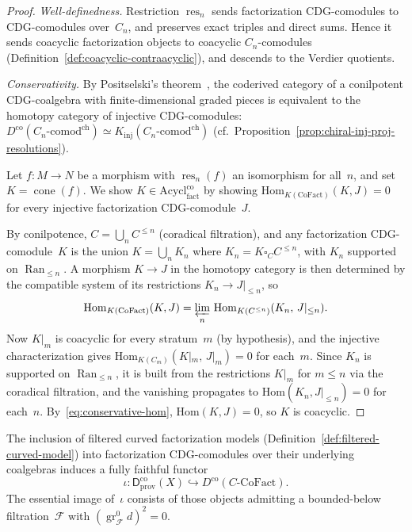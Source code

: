 \begin{proof}
\emph{Well-definedness.}
Restriction $\operatorname{res}_n$ sends factorization
CDG-comodules to CDG-comodules over~$C_n$, and preserves exact
triples and direct sums.  Hence it sends coacyclic factorization
objects to coacyclic $C_n$-comodules
(Definition~\ref{def:coacyclic-contraacyclic}), and descends to
the Verdier quotients.

\emph{Conservativity.}
By Positselski's theorem~\cite[\S5.4]{Positselski11},
the coderived category of a conilpotent CDG-coalgebra with
finite-dimensional graded pieces is equivalent to the homotopy
category of injective CDG-comodules:
$D^{\mathrm{co}}(C_n\text{-}\mathrm{comod}^{\mathrm{ch}})
\simeq K_{\mathrm{inj}}(C_n\text{-}\mathrm{comod}^{\mathrm{ch}})$
(cf.\ Proposition~\ref{prop:chiral-inj-proj-resolutions}).

Let $f \colon M \to N$ be a morphism with
$\operatorname{res}_n(f)$ an isomorphism for all~$n$, and set
$K = \operatorname{cone}(f)$.  We show
$K \in \mathrm{Acycl}^{\mathrm{co}}_{\mathrm{fact}}$ by showing
$\mathrm{Hom}_{K(\mathrm{CoFact})}(K, J) = 0$ for every
injective factorization CDG-comodule~$J$.

By conilpotence, $C = \bigcup_n C^{\leq n}$ (coradical
filtration), and any factorization CDG-comodule~$K$ is the union
$K = \bigcup_n K_n$ where $K_n = K \square_C C^{\leq n}$, with
$K_n$ supported on $\operatorname{Ran}_{\leq n}$.  A morphism
$K \to J$ in the homotopy category is then determined by the
compatible system of its restrictions
$K_n \to J|_{\leq n}$, so
\begin{equation}\label{eq:conservative-hom}
\mathrm{Hom}_{K(\mathrm{CoFact})}(K, J)
= \varprojlim_n\,
\mathrm{Hom}_{K(C^{\leq n})}(K_n,\, J|_{\leq n}).
\end{equation}
Now $K|_m$ is coacyclic for every stratum~$m$ (by hypothesis),
and the injective characterization gives
$\mathrm{Hom}_{K(C_m)}(K|_m,\, J|_m) = 0$ for each~$m$.  Since
$K_n$ is supported on $\operatorname{Ran}_{\leq n}$, it is built
from the restrictions $K|_m$ for $m \leq n$ via the coradical
filtration, and the vanishing propagates to
$\mathrm{Hom}(K_n, J|_{\leq n}) = 0$ for each~$n$.
By~\eqref{eq:conservative-hom},
$\mathrm{Hom}(K, J) = 0$, so $K$ is coacyclic.
\end{proof}

\begin{proposition}
\label{prop:provisional-embedding}
The inclusion of filtered curved factorization models
\textup{(}Definition~\textup{\ref{def:filtered-curved-model})}
into factorization CDG-comodules over their underlying coalgebras
induces a fully faithful functor
\[
\iota \colon
\mathsf{D}^{\mathrm{co}}_{\mathrm{prov}}(X)
\hookrightarrow
D^{\mathrm{co}}(C\text{-}\mathrm{CoFact}).
\]
The essential image of~$\iota$ consists of those objects
admitting a bounded-below filtration~$\mathcal{F}$ with
$(\operatorname{gr}^0_{\mathcal{F}} d)^2 = 0$.
\end{proposition}

